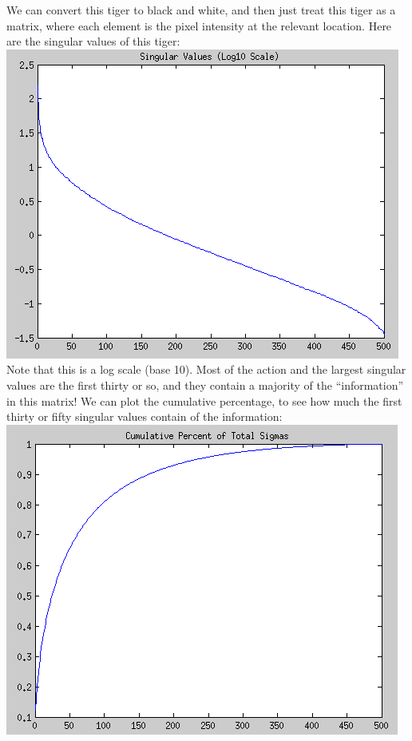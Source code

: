 \documentclass[11pt]{article}
\begin{document}
We can convert this tiger to black and white, and then just treat this tiger as a matrix, where each
element is the pixel intensity at the relevant location. Here are the singular values of this tiger:\\
\includegraphics[scale=0.5]{images/singular_values.png}\\

Note that this is a log scale (base 10). Most of the action and the largest singular values are the
first thirty or so, and they contain a majority of the ``information'' in this matrix! We can plot
the cumulative percentage, to see how much the first thirty or fifty singular values contain of the
information:\\
\includegraphics[scale=0.5]{images/sigmas_cumsum.png}\\
\end{document}
